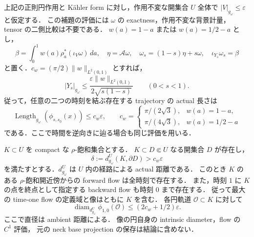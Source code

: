 \begin{lemma}
\label{ke:short-circle-actual-buffer}
上記の正則円作用と K\"ahler form に対し，作用不変な開集合 $U$ 全体で
$|V|_{g_\omega}\le\varepsilon$ と仮定する．
この補題の評価には $\omega$ の exactness，作用不変な背景計量，
tensor の二側比較は不要である．
$w(a)=1-a$ または $w(a)=1/2-a$ とし，
\[
 \beta=\int_0^1 w(a)\rho_a^*(\iota_V\omega)\,da,
 \quad \eta=\mathcal A\omega,
 \quad \omega_s=(1-s)\eta+s\omega,
 \quad \iota_{Y_s}\omega_s=\beta
\]
と置く．$c_w=(\pi/2)\|w\|_{L^2(0,1)}$ とすれば，
\begin{equation}\label{ke:eq:circle-actual-speed}
 |Y_s|_{g_\omega}
 \le\frac{\varepsilon\|w\|_{L^2(0,1)}}{2\sqrt{s(1-s)}}
 \qquad (0<s<1).
\end{equation}
従って，任意の二つの時刻を結ぶ存在する trajectory の actual 長さは
\begin{equation}\label{ke:eq:circle-actual-length}
 \operatorname{Length}_{g_\omega}(\phi_{s,s_0}(x))
 \le c_w\varepsilon,
 \qquad
 c_w=\begin{cases}
 \pi/(2\sqrt3),&w(a)=1-a,\\
 \pi/(4\sqrt3),&w(a)=1/2-a
 \end{cases}
\end{equation}
である．ここで時間を逆向きに辿る場合も同じ評価を用いる．

$K\subset U$ を compact な $\rho$-飽和集合とする．
$K\subset D\Subset U$ なる開集合 $D$ が存在し，
\begin{equation}\label{ke:eq:circle-actual-buffer}
 \delta:=d_{g_\omega}^{U}(K,\partial D)>c_w\varepsilon
\end{equation}
を満たすとする．$d_{g_\omega}^{U}$ は $U$ 内の経路による actual 距離である．
このとき $K$ のある $\rho$-飽和開近傍からの forward flow は全時刻で存在する．
また，時刻 $1$ に $K$ の点を終点として指定する backward flow も時刻 $0$ まで存在する．
従って最大の time-one flow の定義域と像はともに $K$ を含む．
各円軌道 $\mathcal O\subset K$ に対して
\begin{equation}\label{ke:eq:circle-actual-diameter}
 \operatorname{diam}_{d_{g_\omega}^{U}}\phi_{1,0}(\mathcal O)
 \le (2c_w+1/2)\varepsilon.
\end{equation}
ここで直径は ambient 距離による．
像の円自身の intrinsic diameter，flow の $C^1$ 評価，
元の neck base projection の保存は結論に含めない．
\end{lemma}
